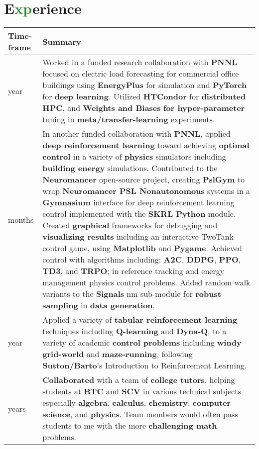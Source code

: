 \documentclass[letterpaper]{twentysecondcv} %
\begin{document}
\section{E\textcolor{ForestGreen}{xp}erience}
\setlength{\tabcolsep}{8pt}  %
\renewcommand{\arraystretch}{1.5} %
\begin{tabular}{|>{\centering\arraybackslash}m{}|>{\RaggedRight\arraybackslash}m{}|}
\hline
Time-frame & Summary\\\hline
1 year & Worked in a funded research collaboration with \textbf{PNNL} focused on electric load forecasting for commercial office buildings using \textbf{EnergyPlus} for simulation and \textbf{PyTorch} for \textbf{deep learning}. Utilized \textbf{HTCondor} for \textbf{distributed} \textbf{HPC}, and \textbf{Weights and Biases} \textbf{for hyper-parameter} tuning in \textbf{meta/transfer-learning} experiments.\\\hline
9 months & In another funded collaboration with \textbf{PNNL}, applied \textbf{deep reinforcement learning} toward achieving \textbf{optimal control} in a variety of \textbf{physics} simulators including \textbf{building energy} simulations. Contributed to the \textbf{Neuromancer} open-source project, creating \textbf{PslGym} to wrap \textbf{Neuromancer PSL Nonautonomous} systems in a \textbf{Gymnasium} interface for deep reinforcement learning control implemented with the \textbf{SKRL Python} module. Created \textbf{graphical} frameworks for debugging and \textbf{visualizing results} including an interactive TwoTank control game, using \textbf{Matplotlib} and \textbf{Pygame}. Achieved control with algorithms including: \textbf{A2C}, \textbf{DDPG}, \textbf{PPO}, \textbf{TD3}, and \textbf{TRPO}; in reference tracking and energy management physics control problems. Added random walk variants to the \textbf{Signals} nm sub-module for \textbf{robust sampling} in \textbf{data generation}.\\\hline
1 year & Applied a variety of \textbf{tabular reinforcement learning} techniques including \textbf{Q-learning} and \textbf{Dyna-Q}, to a variety of academic \textbf{control problems} including \textbf{windy grid-world} and \textbf{maze-running}, following \textbf{Sutton/Barto}'s Introduction to Reinforcement Learning.\\\hline
2 years & \textbf{Collaborated} with a team of \textbf{college tutors}, helping students at \textbf{BTC} and \textbf{SCV} in various technical subjects especially \textbf{algebra}, \textbf{calculus}, \textbf{chemistry}, \textbf{computer science}, and \textbf{physics}. Team members would often pass students to me with the more \textbf{challenging math} problems.\\\hline
\end{tabular}
\end{document}
